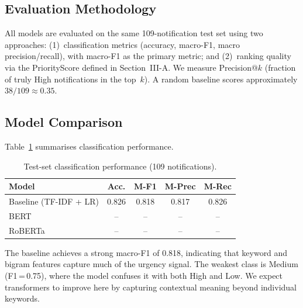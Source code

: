 %

\subsection{Evaluation Methodology}

All models are evaluated on the same 109-notification test set using two
approaches: (1)~classification metrics (accuracy, macro-F1, macro
precision/recall), with macro-F1 as the primary metric; and
(2)~ranking quality via the PriorityScore defined in Section~III-A.
We measure Precision@$k$ (fraction of truly High notifications in the
top~$k$). A random baseline scores approximately $38/109 \approx 0.35$.

\subsection{Model Comparison}

Table~\ref{tab:model_comparison} summarises classification performance.

\begin{table}[!t]
\centering
\caption{Test-set classification performance (109 notifications).}
\label{tab:model_comparison}
\begin{tabular}{lcccc}
\hline
\textbf{Model} & \textbf{Acc.} & \textbf{M-F1} & \textbf{M-Prec} & \textbf{M-Rec} \\
\hline
Baseline (TF-IDF + LR) & 0.826 & 0.818 & 0.817 & 0.826 \\
BERT                    & --    & --    & --    & --    \\
RoBERTa                 & --    & --    & --    & --    \\
\hline
\end{tabular}
\end{table}

The baseline achieves a strong macro-F1 of 0.818, indicating that
keyword and bigram features capture much of the urgency signal. The
weakest class is Medium (F1\,=\,0.75), where the model confuses it with
both High and Low. We expect transformers to improve here by capturing
contextual meaning beyond individual keywords.

